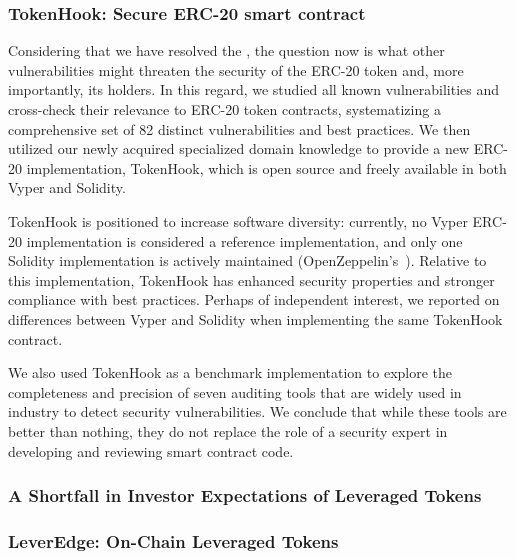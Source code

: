 \subsubsection{TokenHook: Secure ERC-20 smart contract}
Considering that we have resolved the \mwa, the question now is what other vulnerabilities might threaten the security of the ERC-20 token and, more importantly, its holders. In this regard, we studied all known vulnerabilities and cross-check their relevance to ERC-20 token contracts, systematizing a comprehensive set of 82 distinct vulnerabilities and best practices. We then utilized our newly acquired specialized domain knowledge to provide a new ERC-20 implementation, TokenHook, which is open source and freely available in both Vyper and Solidity.

TokenHook is positioned to increase software diversity: currently, no Vyper ERC-20 implementation is considered a reference implementation, and only one Solidity implementation is actively maintained (OpenZeppelin's~\cite{OpenZeppelin_Token}). Relative to this implementation, TokenHook has enhanced security properties and stronger compliance with best practices. Perhaps of independent interest, we reported on differences between Vyper and Solidity when implementing the same TokenHook contract. 

We also used TokenHook as a benchmark implementation to explore the completeness and precision of seven auditing tools that are widely used in industry to detect security vulnerabilities. We conclude that while these tools are better than nothing, they do not replace the role of a security expert in developing and reviewing smart contract code.

\subsubsection{A Shortfall in Investor Expectations of Leveraged Tokens}

\subsubsection{LeverEdge: On-Chain Leveraged Tokens}



